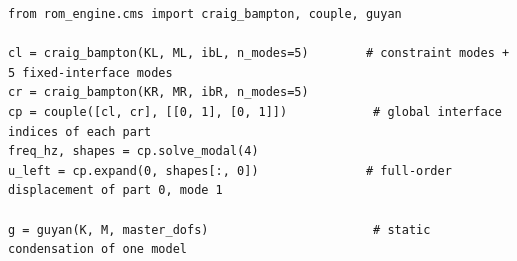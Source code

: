 \begin{lstlisting}[caption={Two Craig--Bampton halves coupled at two interface dofs (KL, ML, ibL: left half and its interface dof positions; KR, MR, ibR: right half).},label={lst:cm-run}]
from rom_engine.cms import craig_bampton, couple, guyan

cl = craig_bampton(KL, ML, ibL, n_modes=5)        # constraint modes + 5 fixed-interface modes
cr = craig_bampton(KR, MR, ibR, n_modes=5)
cp = couple([cl, cr], [[0, 1], [0, 1]])            # global interface indices of each part
freq_hz, shapes = cp.solve_modal(4)
u_left = cp.expand(0, shapes[:, 0])               # full-order displacement of part 0, mode 1

g = guyan(K, M, master_dofs)                       # static condensation of one model
\end{lstlisting}


